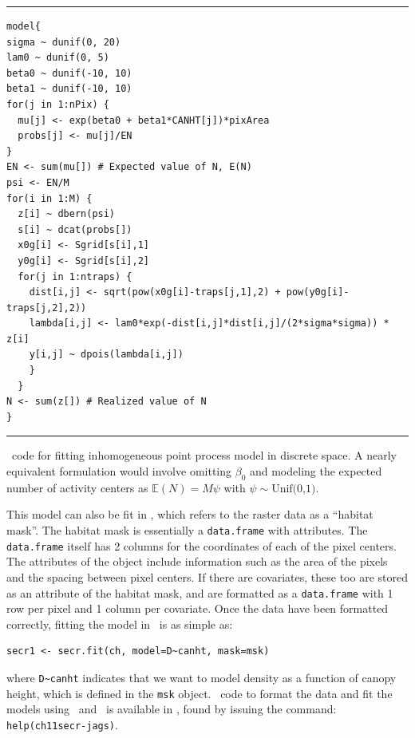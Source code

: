 \begin{panel}%
\centering
\rule[0.05in]{\textwidth}{.03in}
\begin{small}
\begin{verbatim}
model{
sigma ~ dunif(0, 20)
lam0 ~ dunif(0, 5)
beta0 ~ dunif(-10, 10)
beta1 ~ dunif(-10, 10)
for(j in 1:nPix) {
  mu[j] <- exp(beta0 + beta1*CANHT[j])*pixArea
  probs[j] <- mu[j]/EN
}
EN <- sum(mu[]) # Expected value of N, E(N)
psi <- EN/M
for(i in 1:M) {
  z[i] ~ dbern(psi)
  s[i] ~ dcat(probs[])
  x0g[i] <- Sgrid[s[i],1]
  y0g[i] <- Sgrid[s[i],2]
  for(j in 1:ntraps) {
    dist[i,j] <- sqrt(pow(x0g[i]-traps[j,1],2) + pow(y0g[i]-traps[j,2],2))
    lambda[i,j] <- lam0*exp(-dist[i,j]*dist[i,j]/(2*sigma*sigma)) * z[i]
    y[i,j] ~ dpois(lambda[i,j])
    }
  }
N <- sum(z[]) # Realized value of N
}
\end{verbatim}
\end{small}
\rule[0.15in]{\textwidth}{.03in}
\caption{\bugs~code for fitting inhomogeneous point process model in
  discrete space. A nearly equivalent formulation would involve
  omitting $\beta_0$ and modeling the expected number of activity
  centers as $\mathbb{E}(N)=M\psi$ with $\psi \sim \text{Unif(0,1)}$.}
\label{state-space.panel1}
\end{panel}

This model can also be fit in \secr, which refers
to the raster data as a ``habitat mask''. The habitat mask is
essentially a \verb+data.frame+ with attributes. The \verb+data.frame+
itself has 2 columns for the coordinates of each of the pixel
centers. The attributes of the object include information such as the
area of the pixels and the spacing between pixel centers. If there are
covariates, these too are stored as an attribute of the habitat mask,
and are formatted as a \verb+data.frame+ with 1 row per pixel and 1
column per covariate. Once the data have been formatted
correctly, fitting the model in \secr~is as simple as:
\begin{verbatim}
secr1 <- secr.fit(ch, model=D~canht, mask=msk)
\end{verbatim}
where \verb+D~canht+ indicates that we want to model density as a
function of canopy height, which is defined in the \verb+msk+ object.
\R~code to format the data and fit the models using \secr~and \jags~is
available in \scrbook, found by issuing the command: \verb#help(ch11secr-jags)#.

